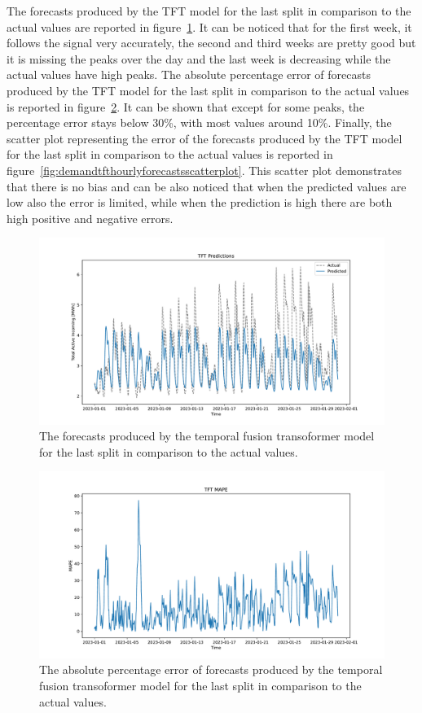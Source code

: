 The forecasts produced by the TFT model for the last split in comparison to the actual values are reported in figure~\ref{fig:demandtfthourlyforecasts}.
It can be noticed that for the first week, it follows the signal very accurately, the second and third weeks are pretty good but it is missing the peaks over the day and the last week is decreasing while the actual values have high peaks.
The absolute percentage error of forecasts produced by the TFT model for the last split in comparison to the actual values is reported in figure~\ref{fig:demandtfthourlyforecastsmape}.
It can be shown that except for some peaks, the percentage error stays below 30\%, with most values around 10\%.
Finally, the scatter plot representing the error of the forecasts produced by the TFT model for the last split in comparison to the actual values is reported in figure~\ref{fig:demandtfthourlyforecastsscatterplot}.
This scatter plot demonstrates that there is no bias and can be also noticed that when the predicted values are low also the error is limited, while when the prediction is high there are both high positive and negative errors.

\begin{figure}[H]
\centering
\includegraphics[width=1\textwidth]{images/demand/TFT}
\caption{The forecasts produced by the temporal fusion transoformer model for the last split in comparison to the actual values.}
\label{fig:demandtfthourlyforecasts}
\end{figure}

\begin{figure}[H]
\centering
\includegraphics[width=1\textwidth]{images/demand/TFT_mape}
\caption{The absolute percentage error of forecasts produced by the temporal fusion transoformer model for the last split in comparison to the actual values.}
\label{fig:demandtfthourlyforecastsmape}
\end{figure}

